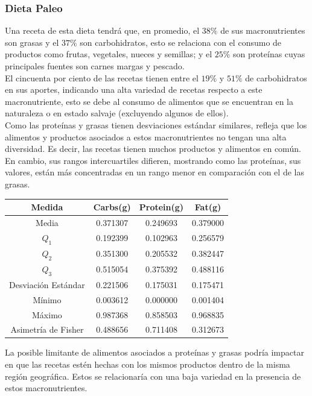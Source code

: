 \documentclass[12pt,a4paper]{article}
\begin{document}
    \subsubsection{Dieta Paleo}
        Una receta de esta dieta tendrá que, en promedio, el $38\%$ de sus 
        macronutrientes son grasas y el $37\%$ son carbohidratos, esto se 
        relaciona con el consumo de productos como frutas, vegetales, nueces 
        y semillas; y el $25\%$ son proteínas cuyas principales fuentes son 
        carnes margas y pescado.\\

        El cincuenta por ciento de las recetas tienen entre el $19\%$ y $51\%$ 
        de carbohidratos en sus aportes, indicando una alta variedad de recetas 
        respecto a este macronutriente, esto se debe al consumo de alimentos que 
        se encuentran en la naturaleza o en estado salvaje (excluyendo algunos 
        de ellos).\\

        Como las proteínas y grasas tienen desviaciones estándar similares, refleja 
        que los alimentos y productos asociados a estos macronutrientes no tengan 
        una alta diversidad. Es decir, las recetas tienen muchos productos y alimentos 
        en común. En cambio, sus rangos intercuartiles difieren, mostrando como 
        las proteínas, sus valores, están más concentradas en un rango menor en 
        comparación con el de las grasas.
        \begin{center}
            \begin{tabular}{|c|ccc|}
                \hline
                Medida & Carbs(g) & Protein(g) & Fat(g) \\
                \hline
                Media               & 0.371307 & 0.249693 & 0.379000  \\
                $Q_1$               & 0.192399 & 0.102963 & 0.256579  \\
                $Q_2$               & 0.351300 & 0.205532 & 0.382447  \\
                $Q_3$               & 0.515054 & 0.375392 & 0.488116  \\
                Desviación Estándar & 0.221506 & 0.175031 & 0.175471  \\
                Mínimo              & 0.003612 & 0.000000 & 0.001404  \\
                Máximo              & 0.987368 & 0.858503 & 0.968835  \\
                Asimetría de Fisher & 0.488656 & 0.711408 & 0.312673  \\
                \hline
            \end{tabular}
        \end{center}
        La posible limitante de alimentos asociados a proteínas	y grasas 
        podría impactar en que las recetas estén hechas con los mismos productos 
        dentro de la misma región geográfica. Estos se relacionaría con una 
        baja variedad en la presencia de estos macronutrientes.\\
\end{document}
